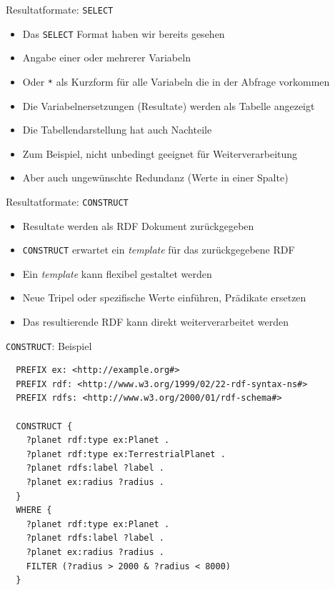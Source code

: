 \documentclass{beamer}
\begin{document}
\begin{frame}{Resultatformate: \texttt{SELECT}}
	
	\begin{itemize}
		\item Das \texttt{SELECT} Format haben wir bereits gesehen
		\item Angabe einer oder mehrerer Variabeln
		\item Oder \texttt{*} als Kurzform für alle Variabeln die in der Abfrage vorkommen
		\item Die Variabelnersetzungen (Resultate) werden als Tabelle angezeigt
		\item Die Tabellendarstellung hat auch Nachteile
		\item Zum Beispiel, nicht unbedingt geeignet für Weiterverarbeitung
		\item Aber auch ungewünschte Redundanz (Werte in einer Spalte)
	\end{itemize}
	
\end{frame}


\begin{frame}{Resultatformate: \texttt{CONSTRUCT}}
	
	\begin{itemize}
		\item Resultate werden als RDF Dokument zurückgegeben
		\item \texttt{CONSTRUCT} erwartet ein \emph{template} für das zurückgegebene RDF
		\item Ein \emph{template} kann flexibel gestaltet werden
		\item Neue Tripel oder spezifische Werte einführen, Prädikate ersetzen
		\item Das resultierende RDF kann direkt weiterverarbeitet werden
	\end{itemize}
	
\end{frame}

\begin{frame}[fragile]{\texttt{CONSTRUCT}: Beispiel}
	
	\small
	\begin{lstlisting}
  PREFIX ex: <http://example.org#> 
  PREFIX rdf: <http://www.w3.org/1999/02/22-rdf-syntax-ns#>
  PREFIX rdfs: <http://www.w3.org/2000/01/rdf-schema#>
	
  CONSTRUCT {
    ?planet rdf:type ex:Planet .
    ?planet rdf:type ex:TerrestrialPlanet .
    ?planet rdfs:label ?label .
    ?planet ex:radius ?radius .
  }
  WHERE {
    ?planet rdf:type ex:Planet .
    ?planet rdfs:label ?label .
    ?planet ex:radius ?radius .
    FILTER (?radius > 2000 & ?radius < 8000)
  }
	\end{lstlisting}
	
\end{frame}
\end{document}
